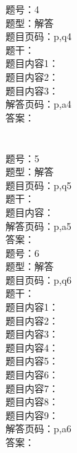 \documentclass[11pt]{article}
\theoremstyle{definition}
\begin{document}
\begin{CJK*}{UTF8}{gbsn}
题号：4\\
题型：解答\\
题目页码：p,q4\\
题干：\\
题目内容1：\\
题目内容2：\\
题目内容3：\\
解答页码：p,a4\\
答案：\\
\\
\\

题号：5\\
题型：解答\\
题目页码：p,q5\\
题干：\\
题目内容：\\
解答页码：p,a5\\
答案：\\

题号：6\\
题型：解答\\
题目页码：p,q6\\
题干：\\
题目内容1：\\
题目内容2：\\
题目内容3：\\
题目内容4：\\
题目内容5：\\
题目内容6：\\
题目内容7：\\
题目内容8：\\
题目内容9：\\
解答页码：p,a6\\
答案：\\
\\
\\
\\
\\
\\
\\
\\
\\

\end{CJK*}
\end{document}
